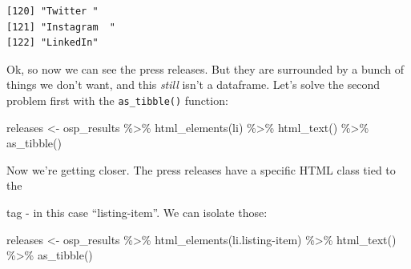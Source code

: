 \documentclass[
  letterpaper,
  DIV=11,
  numbers=noendperiod]{scrreprt}
\newenvironment{Shaded}{\begin{snugshade}}{\end{snugshade}}
\newcommand{\FunctionTok}[1]{\textcolor[rgb]{0.28,0.35,0.67}{#1}}
\newcommand{\NormalTok}[1]{\textcolor[rgb]{0.00,0.23,0.31}{#1}}
\newcommand{\OtherTok}[1]{\textcolor[rgb]{0.00,0.23,0.31}{#1}}
\newcommand{\SpecialCharTok}[1]{\textcolor[rgb]{0.37,0.37,0.37}{#1}}
\newcommand{\StringTok}[1]{\textcolor[rgb]{0.13,0.47,0.30}{#1}}
\begin{document}
\begin{verbatim}
[120] "Twitter "                                                                                                                                                                                                                                            
[121] "Instagram  "                                                                                                                                                                                                                                         
[122] "LinkedIn"                                                                                                                                                                                                                                            
\end{verbatim}

Ok, so now we can see the press releases. But they are surrounded by a
bunch of things we don't want, and this \emph{still} isn't a dataframe.
Let's solve the second problem first with the \texttt{as\_tibble()}
function:

\begin{Shaded}
\begin{Highlighting}[]
\NormalTok{releases }\OtherTok{\textless{}{-}}\NormalTok{ osp\_results }\SpecialCharTok{\%\textgreater{}\%} \FunctionTok{html\_elements}\NormalTok{(}\StringTok{\textquotesingle{}li\textquotesingle{}}\NormalTok{) }\SpecialCharTok{\%\textgreater{}\%} \FunctionTok{html\_text}\NormalTok{() }\SpecialCharTok{\%\textgreater{}\%} \FunctionTok{as\_tibble}\NormalTok{()}
\end{Highlighting}
\end{Shaded}

Now we're getting closer. The press releases have a specific HTML class
tied to the

tag - in this case ``listing-item''. We can isolate those:

\begin{Shaded}
\begin{Highlighting}[]
\NormalTok{releases }\OtherTok{\textless{}{-}}\NormalTok{ osp\_results }\SpecialCharTok{\%\textgreater{}\%} \FunctionTok{html\_elements}\NormalTok{(}\StringTok{\textquotesingle{}li.listing{-}item\textquotesingle{}}\NormalTok{) }\SpecialCharTok{\%\textgreater{}\%} \FunctionTok{html\_text}\NormalTok{() }\SpecialCharTok{\%\textgreater{}\%} \FunctionTok{as\_tibble}\NormalTok{()}
\end{Highlighting}
\end{Shaded}
\end{document}

